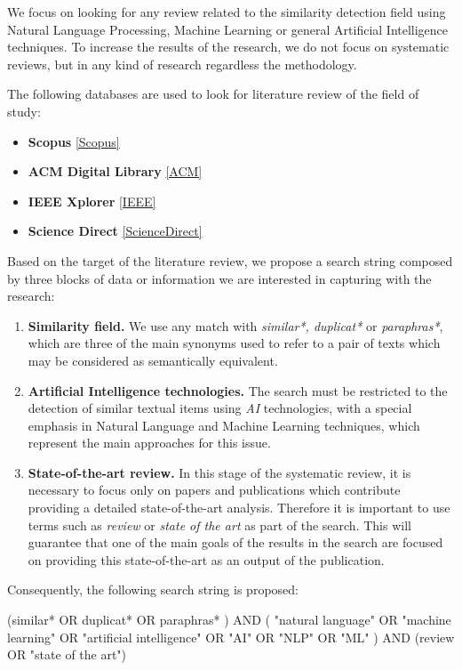 We focus on looking for any review related to the similarity detection field using Natural Language Processing, Machine Learning or general Artificial Intelligence techniques. To increase the results of the research, we do not focus on systematic reviews, but in any kind of research regardless the methodology. 

The following databases are used to look for literature review of the field of study:

\begin{itemize}
\item \textbf{Scopus} \ref{Scopus}
\item \textbf{ACM Digital Library} \ref{ACM}
\item \textbf{IEEE Xplorer} \ref{IEEE}
\item \textbf{Science Direct} \ref{ScienceDirect}
\end{itemize}

Based on the target of the literature review, we propose a search string composed by three blocks of data or information we are interested in capturing with the research:

\begin{enumerate}
\item \textbf{Similarity field.} We use any match with \textit{similar*, duplicat*} or \textit{paraphras*}, which are three of the main synonyms used to refer to a pair of texts which may be considered as semantically equivalent. 
\item \textbf{Artificial Intelligence technologies.} The search must be restricted to the detection of similar textual items using \textit{AI} technologies, with a special emphasis in Natural Language and Machine Learning techniques, which represent the main approaches for this issue.
\item \textbf{State-of-the-art review.} In this stage of the systematic review, it is necessary to focus only on papers and publications which contribute providing a detailed state-of-the-art analysis. Therefore it is important to use terms such as \textit{review} or \textit{state of the art} as part of the search. This will guarantee that one of the main goals of the results in the search are focused on providing this state-of-the-art as an output of the publication.
\end{enumerate}

Consequently, the following search string is proposed:

\begin{center}
(similar*  OR  duplicat*  OR  paraphras* )  AND  ( "natural language"  OR  "machine learning"  OR  "artificial intelligence"  OR  "AI" OR  "NLP"  OR  "ML" )  AND  (review  OR  "state of the art")
\end{center}

